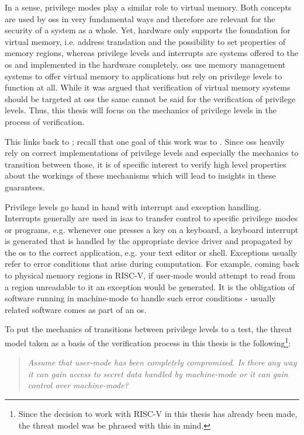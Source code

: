 In a sense, privilege modes play a similar role to virtual memory.
Both concepts are used by \glspl{os} in very fundamental ways and therefore are relevant for the security of a system as a whole.
Yet, hardware only supports the foundation for virtual memory, i.e. address translation and the possibility to set properties of memory regions, whereas privilege levels and interrupts are systems offered to the \gls{os} and implemented in the hardware completely.
\glspl{os} use memory management systems to offer virtual memory to applications but rely on privilege levels to function at all.
While it was argued that verification of virtual memory systems should be targeted at \glspl{os} the same cannot be said for the verification of privilege levels.
Thus, this thesis will focus on the mechanics of privilege levels in the process of verification.

This links back to \cite{Reid17}; recall that one goal of this work was to .
Since \glspl{os} heavily rely on correct implementations of privilege levels and especially the mechanics to transition between those, it is of specific interest to verify high level properties about the workings of these mechanisms which will lead to insights in these guarantees.

Privilege levels go hand in hand with interrupt and exception handling.
Interrupts generally are used in \glspl{isa} to transfer control to specific privilege modes or programs, e.g. whenever one presses a key on a keyboard, a keyboard interrupt is generated that is handled by the appropriate device driver and propagated by the \gls{os} to the correct application, e.g. your text editor or shell.
Exceptions usually refer to error conditions that arise during computation.
For example, coming back to physical memory regions in RISC-V, if user-mode would attempt to read from a region unreadable to it an exception would be generated.
It is the obligation of software running in machine-mode to handle such error conditions - usually related software comes as part of an \gls{os}.

To put the mechanics of transitions between privilege levels to a test, the threat model taken as a basis of the verification process in this thesis is the following\footnote{%
    Since the decision to work with RISC-V in this thesis has already been made, the threat model was be phrased with this in mind.
}:
\begin{quote}
    \itshape
    Assume that user-mode has been completely compromised.
    Is there any way it can gain access to secret data handled by machine-mode or it can gain control over machine-mode?
\end{quote}

